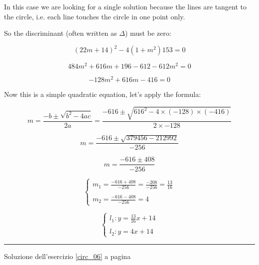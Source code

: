 In this case we are looking for a single solution because the lines are tangent to the circle, i.e. each line touches the circle in one point only.

So the discriminant (often written as $\Delta$) must be zero:

\begin{equation*}
(22m+14)^2-4(1+m^2)153=0
\end{equation*}

\begin{equation*}
484m^2+616m+196-612-612m^2=0
\end{equation*}

\begin{equation*}
-128m^2+616m-416=0
\end{equation*}

Now this is a simple quadratic equation, let's apply the formula:

\begin{equation*}
m=\frac{-b\pm\sqrt{b^2-4ac}}{2a}=\frac{-616\pm \sqrt{616^2-4\times(-128)\times(-416)}}{2\times -128}
\end{equation*}


\begin{equation*}
m=\frac{-616\pm \sqrt{379456-212992}}{-256}
\end{equation*}


\begin{equation*}
m=\frac{-616\pm 408}{-256}
\end{equation*}

\begin{equation*}
\left\{
\begin{array}{ll}
m_1=\frac{-616+408}{-256}=\frac{-208}{-256}=\frac{13}{16}\\
\\
m_2=\frac{-616-408}{-256}=4
\end{array}
\right.
\end{equation*}

\begin{equation*}
\left\{
\begin{array}{ll}
l_1: y=\frac{13}{16}x+14\\
\\
l_2: y=4x+14
\end{array}
\right.
\end{equation*}

\vspace{1cm}
\hrule
\vspace{1cm}


Soluzione dell'esercizio \ref{circ_06} a pagina \pageref{circ_06}\label{circs_06}

